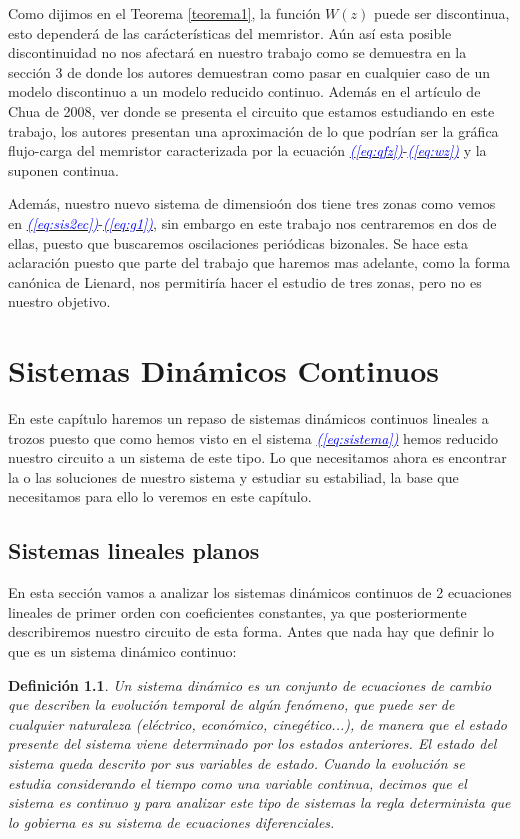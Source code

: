 \documentclass[12pt,a4paper]{report} %
\newtheorem{definicion}{Definición}[chapter] %
\newcommand{\eref}[1]{\hyperref[#1]{\textcolor{blue}{\textit{(\ref*{#1})}}}}
\begin{document}
	\vspace{0.5cm}Como dijimos en el Teorema \ref{teorema1}, la función $W(z)$ puede ser discontinua, esto dependerá de las carácterísticas del memristor. Aún así esta posible discontinuidad no nos afectará en nuestro trabajo como se demuestra en la sección 3 de \cite{ponce} donde los autores demuestran como pasar en cualquier caso de un modelo discontinuo a un modelo reducido continuo. Además en el artículo de Chua de 2008, ver \cite{chuaoscillator2008} donde se presenta el circuito que estamos estudiando en este trabajo, los autores presentan una aproximación de lo que podrían ser la gráfica flujo-carga del memristor caracterizada por la ecuación \eref{eq:qfz}-\eref{eq:wz} y la suponen continua.
	
	\vspace{0.5cm}Además, nuestro nuevo sistema de dimensioón dos tiene tres zonas como vemos en \eref{eq:sis2ec}-\eref{eq:g1}, sin embargo en este trabajo nos centraremos en dos de ellas, puesto que buscaremos oscilaciones periódicas bizonales. Se hace esta aclaración puesto que parte del trabajo que haremos mas adelante, como la forma canónica de Lienard, nos permitiría hacer el estudio de tres zonas, pero no es nuestro objetivo.
	
	

	
	\chapter{Sistemas Dinámicos Continuos}
	En este capítulo haremos un repaso de sistemas dinámicos continuos lineales a trozos puesto que como hemos visto en el sistema \eref{eq:sistema} hemos reducido nuestro circuito a un sistema de este tipo. Lo que necesitamos ahora es encontrar la o las soluciones de nuestro sistema y estudiar su estabiliad, la base que necesitamos para ello lo veremos en este capítulo.
	\newpage
	\section{Sistemas lineales planos}
	\label{sec:sislinplanos}
	En esta sección vamos a analizar los sistemas dinámicos continuos de 2 ecuaciones lineales de primer orden con coeficientes constantes, ya que posteriormente describiremos nuestro circuito de esta forma.
	Antes que nada hay que definir lo que es un sistema dinámico continuo:
	
	\begin{definicion}
		Un sistema dinámico es un conjunto de ecuaciones de cambio que describen la evolución temporal de algún fenómeno, que puede ser de cualquier naturaleza (eléctrico, económico, cinegético...), de manera que el estado presente del sistema viene determinado por los estados anteriores. El estado del sistema queda descrito por sus variables de estado. Cuando la evolución se estudia considerando el tiempo como una variable 
		continua, decimos que el sistema es continuo y para analizar este tipo de sistemas la regla determinista que lo gobierna es su sistema de ecuaciones diferenciales.
	\end{definicion}
	
\end{document}
